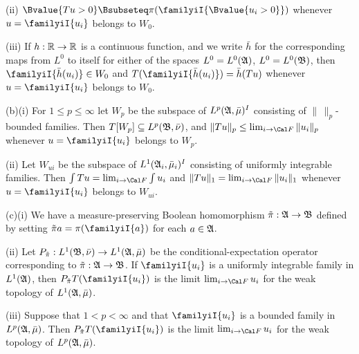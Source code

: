 \quad(ii) $\Bvalue{Tu>0}\Bsubseteq\pi(\familyiI{\Bvalue{u_i>0}})$ whenever
$u=\familyiI{u_i}$ belongs to $W_0$.

\quad(iii) If $h:\Bbb R\to\Bbb R$ is a continuous function, and we write
$\bar h$ for the corresponding maps from $L^0$ to itself for either of the
spaces $L^0=L^0(\frak A)$, $L^0=L^0(\frak B)$, then
$\familyiI{\bar h(u_i)}\in W_0$ and
$T(\familyiI{\bar h(u_i)})=\bar h(Tu)$ whenever
$u=\familyiI{u_i}$ belongs to $W_0$.

(b)(i) For $1\le p\le\infty$
let $W_p$ be the subspace of $L^p(\frak A,\bar\mu)^I$
consisting of $\|\,\|_p$-bounded families.   Then
$T[W_p]\subseteq L^p(\frak B,\bar\nu)$, and
$\|Tu\|_p\le\lim_{i\to\Cal F}\|u_i\|_p$
whenever $u=\familyiI{u_i}$ belongs to $W_p$.

\quad(ii) Let $W_{ui}$ be the subspace of
$L^1(\frak A_i,\bar\mu_i)^I$
consisting of uniformly integrable families.
Then $\int Tu=\lim_{i\to\Cal F}\int u_i$ and
$\|Tu\|_1=\lim_{i\to\Cal F}\|u_i\|_1$
whenever $u=\familyiI{u_i}$ belongs to $W_{ui}$.

(c)(i) We have a measure-preserving Boolean homomorphism
$\tilde\pi:\frak A\to\frak B$ defined by setting
$\tilde\pi a=\pi(\familyiI{a})$ for each $a\in\frak A$.

\quad(ii) Let $P_{\tilde\pi}:L^1(\frak B,\bar\nu)\to L^1(\frak A,\bar\mu)$
be the conditional-expectation operator corresponding to
$\tilde\pi:\frak A\to\frak B$.
If $\familyiI{u_i}$ is a uniformly
integrable family in $L^1(\frak A)$, then $P_{\tilde\pi}T(\familyiI{u_i})$
is the limit $\lim_{i\to\Cal F}u_i$ for the weak topology of
$L^1(\frak A,\bar\mu)$.

\quad(iii) Suppose that $1<p<\infty$ and that $\familyiI{u_i}$ is a
bounded family
in $L^p(\frak A,\bar\mu)$.   Then $P_{\tilde\pi}T(\familyiI{u_i})$ is the
limit $\lim_{i\to\Cal F}u_i$ for the weak topology of
$L^p(\frak A,\bar\mu)$.

